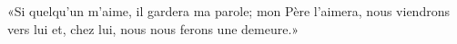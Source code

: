 \encetemps \jesusdisciples
	«Si quelqu’un m’aime, il gardera ma parole;
	mon Père l’aimera, nous viendrons vers lui
	et, chez lui, nous nous ferons une demeure.»
